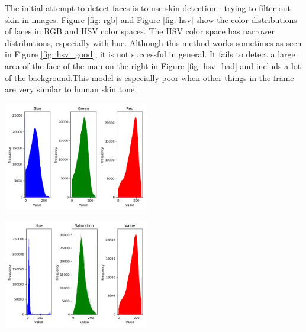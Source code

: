 \documentclass{article}
\begin{document}
The initial attempt to detect faces is to use skin detection - trying to filter out skin in images. Figure \ref{fig: rgb} and Figure \ref{fig: hsv} show the color distributions of faces in RGB and HSV color spaces. The HSV color space has narrower distributions, especially with hue. Although this method works sometimes as seen in Figure \ref{fig: hsv_good}, it is not successful in general. It fails to detect a large area of the face of the man on the right in Figure \ref{fig: hsv_bad} and includs a lot of the background.This model is especially poor when other things in the frame are very similar to human skin tone.

\vspace*{20pt}
\begin{minipage}{0.5\linewidth}
 \label{fig: rgb}
\centering
\includegraphics[width=2.5in]{../output/f_train_rgb_distributions.png}
\end{minipage}%
\begin{minipage}{0.5\linewidth}
 \label{fig: hsv}
\centering
\includegraphics[width=2.5in]{../output/f_train_hsv_distributions.png}
\end{minipage}
\end{document}
